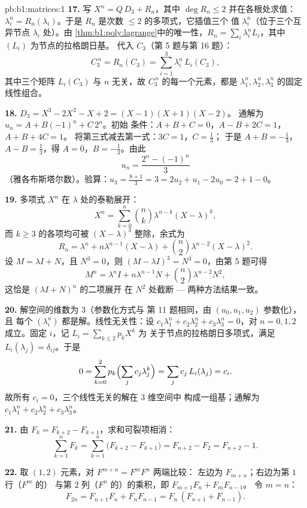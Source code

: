 \begin{solution}{pb:b1:matrices:1}
\textbf{17.} 写 $X^n = Q\,D_3 + R_n$，其中 $\deg R_n \leq 2$
并在各根处求值：$\lambda_i^n = R_n(\lambda_i)$。于是
$R_n$ 是次数 $\leq 2$ 的多项式，它插值三个
值 $\lambda_i^n$（位于三个互异节点 $\lambda_i$ 处）。由
\cref{thm:b1:poly:lagrange}中的唯一性，$R_n = \sum_i
\lambda_i^n L_i$，其中 $(L_i)$ 为节点的拉格朗日基。
代入 $C_3$（第 5 题与第 16 题）：
\[
C_3^{\,n} = R_n(C_3) = \sum_{i=1}^{3} \lambda_i^n\,L_i(C_3),
\]
其中三个矩阵 $L_i(C_3)$ 与 $n$ 无关，故
$C_3^{\,n}$ 的每一个元素，都是 $\lambda_1^n,
\lambda_2^n, \lambda_3^n$ 的固定线性组合。

\textbf{18.} $D_3 = X^3 - 2X^2 - X + 2 = (X-1)(X+1)(X-2)$。
通解为 $u_n = A + B(-1)^n + C\,2^n$。初始
条件：$A + B + C = 0$，$A - B + 2C = 1$，$A + B + 4C = 1$。
将第三式减去第一式：$3C = 1$，$C = \frac13$；
于是 $A + B = -\frac13$，$A - B = \frac13$，得 $A = 0$，$B =
-\frac13$。由此
\[
u_n = \frac{2^n - (-1)^n}{3}
\]
（雅各布斯塔尔数）。验算：$u_3 = \frac{8 + 1}{3} = 3 =
2u_2 + u_1 - 2u_0 = 2 + 1 - 0$。

\textbf{19.} 多项式 $X^n$ 在
$\lambda$ 处的泰勒展开：
\[
X^n = \sum_{k=0}^{n} \binom nk \lambda^{n-k}(X - \lambda)^k ,
\]
而 $k \geq 3$ 的各项均可被 $(X -
\lambda)^3$ 整除，余式为
\[
R_n = \lambda^n + n\lambda^{n-1}(X - \lambda) + \binom
n2\lambda^{n-2}(X - \lambda)^2 .
\]
设 $M = \lambda I + N$，且 $N^3 = 0$，则 $(M - \lambda I)^3 = N^3
= 0$，由第 5 题可得
\[
M^n = \lambda^n I + n\lambda^{n-1} N + \binom n2
\lambda^{n-2} N^2 ,
\]
这恰是 $(\lambda I + N)^n$ 的二项展开
在 $N^2$ 处截断 --- 两种方法结果一致。

\textbf{20.} 解空间的维数为 $3$（参数化方式与
第 11 题相同，由 $(u_0, u_1, u_2)$ 参数化），且
每个 $(\lambda_i^n)$ 都是解。线性无关性：设
$c_1\lambda_1^n + c_2\lambda_2^n + c_3\lambda_3^n = 0$，对 $n =
0, 1, 2$ 成立。固定 $i$，记 $L_i = \sum_{k \leq 2} p_k X^k$ 为
关于节点的拉格朗日多项式，满足 $L_i(\lambda_j) =
\delta_{ij}$。于是
\[
0 = \sum_{k=0}^{2} p_k\Bigl(\sum_j c_j\lambda_j^k\Bigr)
= \sum_j c_j\,L_i(\lambda_j) = c_i .
\]
故所有 $c_i = 0$，三个线性无关的解在 $3$ 维空间中
构成一组基；通解为 $c_1\lambda_1^n +
c_2\lambda_2^n + c_3\lambda_3^n$。

\textbf{21.} 由 $F_k = F_{k+2} - F_{k+1}$，求和可裂项相消：
\[
\sum_{k=1}^{n} F_k = \sum_{k=1}^{n}\bigl(F_{k+2} - F_{k+1}\bigr)
= F_{n+2} - F_2 = F_{n+2} - 1 .
\]

\textbf{22.} 取 $(1,2)$ 元素，对 $F^{m+n} = F^m F^n$ 两端比较：
左边为 $F_{m+n}$；右边为第 $1$ 行（$F^m$ 的）
与第 $2$ 列（$F^n$ 的）的乘积，即 $F_{m+1}F_n + F_m F_{n-1}$。
令 $m = n$：
\[
F_{2n} = F_{n+1}F_n + F_nF_{n-1} = F_n\,(F_{n+1} + F_{n-1}).
\]


\end{solution}
